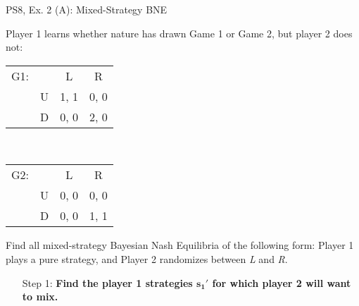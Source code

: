 \begin{frame}{PS8, Ex. 2 (A): Mixed-Strategy BNE}
    \begin{multicols}{2}
      Player 1 learns whether nature has drawn Game 1 or Game 2, but player 2 does not:
      \begin{table}
        \begin{tabular}{ll|c|c|}
          \multicolumn{1}{c}{G1:} & \multicolumn{1}{c}{} & \multicolumn{1}{c}{L} & \multicolumn{1}{c}{R} \\\cline{3-4}
          & U & 1, 1 & 0, 0 \\\cline{3-4}
          & D & 0, 0 & 2, 0 \\\cline{3-4}
        \end{tabular}\\\bigskip
        \begin{tabular}{ll|c|c|}
          \multicolumn{1}{c}{G2:} & \multicolumn{1}{c}{} & \multicolumn{1}{c}{L} & \multicolumn{1}{c}{R} \\\cline{3-4}
          & U & 0, 0 & 0, 0 \\\cline{3-4}
          & D & 0, 0 & 1, 1 \\\cline{3-4}
        \end{tabular}
      \end{table}
      Find all mixed-strategy Bayesian Nash Equilibria of the following form: Player 1 plays a pure strategy, and Player 2 randomizes between \textit{L} and \textit{R}.
      \begin{itemize}
        \item[Step 1:] \textbf{Find the player 1 strategies $\bm{s_1'}$ for which player 2 will want to mix.}
      \end{itemize}
      \vfill\null\columnbreak
      \vfill\null
    \end{multicols}
\end{frame}
